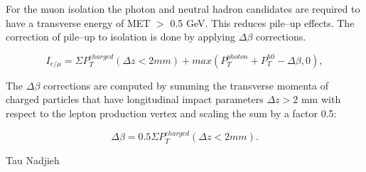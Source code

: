 For the muon isolation the photon and neutral hadron candidates are required to have a transverse energy of MET $>$ 0.5 GeV. This reduces pile–up effects. The correction of pile–up to isolation is done by applying $\Delta\beta$ corrections.
\begin{linenomath}
\begin{equation}
\label{eq:muonisolation1}
I_{e/ \mu}=\Sigma P_{T}^{charged }(\Delta z <2mm)+max(P_{T}^{photon}+P_{T}^{h0 }-\Delta \beta,0),
\end{equation}
\end{linenomath}
The $\Delta\beta$ corrections are computed by summing the transverse momenta of charged particles
that have longitudinal impact parameters $\Delta z > 2$ mm with respect to the lepton production
vertex and scaling the sum by a factor 0.5:
\begin{linenomath}
\begin{equation}
\label{eq:muonisolation2}
\Delta\beta=0.5 \Sigma P_{T}^{charged }(\Delta z <2mm).
\end{equation}
\end{linenomath}

Tau
Nadjieh
